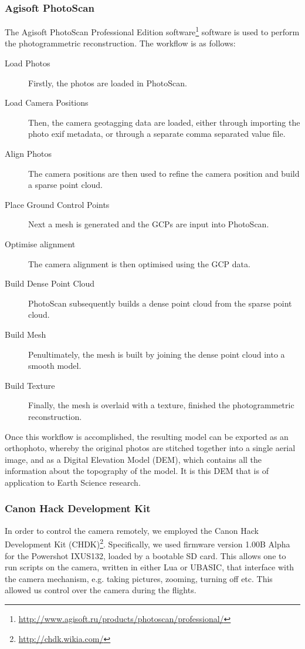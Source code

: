\subsubsection{Agisoft PhotoScan}

The Agisoft PhotoScan Professional Edition
software\footnote{\url{http://www.agisoft.ru/products/photoscan/professional/}}
software is used to perform the photogrammetric reconstruction. The workflow is
as follows:

\begin{description}
    \item[Load Photos] Firstly, the photos are loaded in PhotoScan.
    \item[Load Camera Positions] Then, the camera geotagging data are loaded,
        either through importing the photo exif metadata, or through a separate
        comma separated value file.
    \item[Align Photos] The camera positions are then used to refine the camera
        position and build a sparse point cloud.
    \item[Place Ground Control Points] Next a mesh is generated and the GCPs are
        input into PhotoScan.
    \item[Optimise alignment] The camera alignment is then optimised using the
        GCP data.
    \item[Build Dense Point Cloud] PhotoScan subsequently builds a dense point
        cloud from the sparse point cloud.
    \item[Build Mesh] Penultimately, the mesh is built by joining the dense
        point cloud into a smooth model.
    \item[Build Texture] Finally, the mesh is overlaid with a texture, finished
        the photogrammetric reconstruction.
\end{description}

Once this workflow is accomplished, the resulting model can be exported as an
orthophoto, whereby the original photos are stitched together into a single
aerial image, and as a Digital Elevation Model (DEM), which contains all the
information about the topography of the model. It is this DEM that is of
application to Earth Science research.

\subsubsection{Canon Hack Development Kit}

In order to control the camera remotely, we employed the Canon Hack Development
Kit (CHDK)\footnote{\url{http://chdk.wikia.com/}}. Specifically, we used
firmware version 1.00B Alpha for the Powershot
IXUS132, loaded by a bootable SD
card. This allows one to run scripts on the camera, written in either Lua or
UBASIC, that interface with the camera mechanism, e.g. taking pictures, zooming,
turning off etc. This allowed us control over the camera during the flights.
